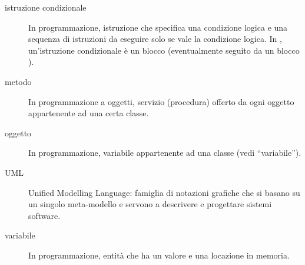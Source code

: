 \begin{description}
	\item[istruzione condizionale] In programmazione, istruzione che specifica una condizione logica e una sequenza di istruzioni da eseguire solo se vale la condizione logica. In \proj, un'istruzione condizionale è un blocco  (eventualmente seguito da un blocco ).
	\item[metodo] In programmazione a oggetti, servizio (procedura) offerto da ogni oggetto appartenente ad una certa classe.
	\item[oggetto] In programmazione, variabile appartenente ad una classe (vedi “variabile”).
	\item[UML] Unified Modelling Language: famiglia di notazioni grafiche che si basano su un singolo meta-modello e servono a descrivere e progettare sistemi software.
	\item[variabile] In programmazione, entità che ha un valore e una locazione in memoria.
\end{description}




